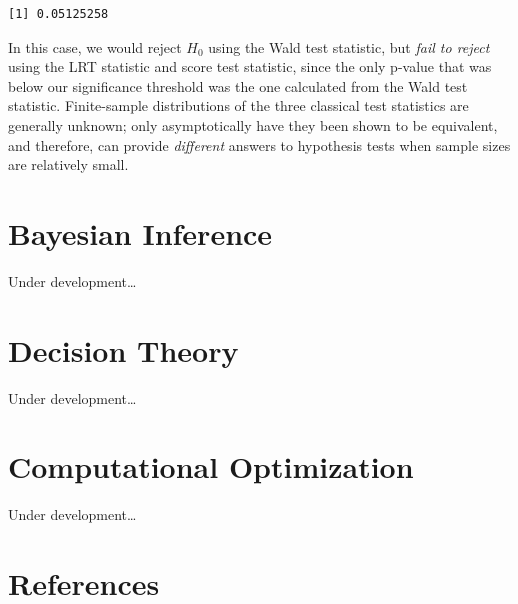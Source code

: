 \documentclass[
  letterpaper,
  DIV=11,
  numbers=noendperiod]{scrreprt}
\newlength{\cslhangindent}
\newlength{\cslentryspacingunit} %
\newenvironment{CSLReferences}[2] %
 {%
  \setlength{\parindent}{0pt}
  \ifodd #1
  \let\oldpar\par
  \def\par{\hangindent=\cslhangindent\oldpar}
  \fi
  \setlength{\parskip}{#2\cslentryspacingunit}
 }%
 {}
\begin{document}
\begin{verbatim}
[1] 0.05125258
\end{verbatim}

In this case, we would reject \(H_0\) using the Wald test statistic, but
\emph{fail to reject} using the LRT statistic and score test statistic,
since the only p-value that was below our significance threshold was the
one calculated from the Wald test statistic. Finite-sample distributions
of the three classical test statistics are generally unknown; only
asymptotically have they been shown to be equivalent, and therefore, can
provide \emph{different} answers to hypothesis tests when sample sizes
are relatively small.


\hypertarget{bayesian-inference}{%
\chapter{Bayesian Inference}\label{bayesian-inference}}

Under development\ldots{}


\hypertarget{decision-theory}{%
\chapter{Decision Theory}\label{decision-theory}}

Under development\ldots{}


\hypertarget{computational-optimization}{%
\chapter{Computational Optimization}\label{computational-optimization}}

Under development\ldots{}


\hypertarget{references}{%
\chapter*{References}\label{references}}


\hypertarget{refs}{}
\begin{CSLReferences}{0}{0}
\end{CSLReferences}
\end{document}
